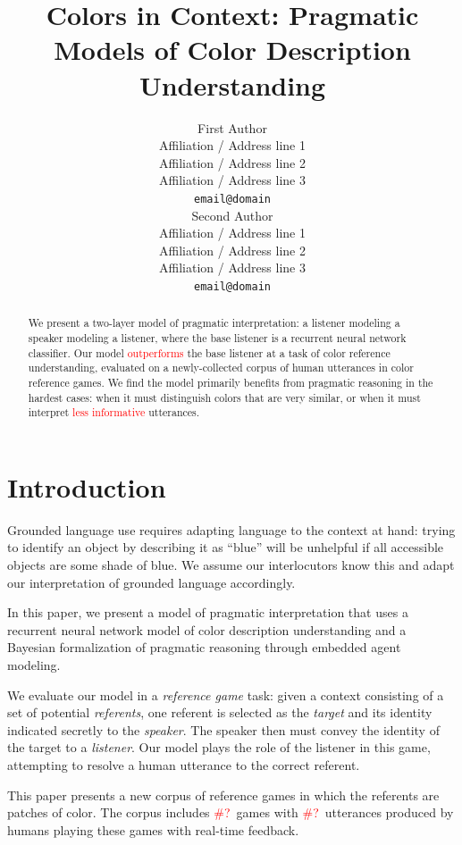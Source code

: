 \documentclass[11pt,letterpaper]{article}
\title{Colors in Context: Pragmatic Models of Color Description Understanding}
\author{First Author \\
  Affiliation / Address line 1 \\
  Affiliation / Address line 2 \\
  Affiliation / Address line 3 \\
  {\tt email@domain} \\\And
  Second Author \\
  Affiliation / Address line 1 \\
  Affiliation / Address line 2 \\
  Affiliation / Address line 3 \\
  {\tt email@domain} \\}
\date{}
\newcommand{\term}{\textit}
\renewcommand{\|}{\mid}
\newcommand{\todocheck}[1]{\textcolor{red}{#1}}
\begin{document}
\maketitle
\begin{abstract}

We present a two-layer model of pragmatic interpretation: a listener
modeling a speaker modeling a listener, where the base listener is a
recurrent neural network classifier. Our model \todocheck{outperforms} the
base listener at a task of color reference understanding, evaluated on a
newly-collected corpus of human utterances in color reference games.
We find the model primarily benefits from pragmatic reasoning in the hardest
cases: when it must distinguish colors that are very similar, or when
it must interpret \todocheck{less informative} utterances.

\end{abstract}

\section{Introduction}

Grounded language use requires adapting language to the context at hand: trying
to identify an object by describing it as ``blue'' will be unhelpful if all
accessible objects are some shade of blue. We assume our interlocutors know
this and adapt our interpretation of grounded language accordingly.

In this paper, we present a model of pragmatic interpretation that uses a
recurrent neural network model of color description understanding and a
Bayesian formalization of pragmatic reasoning through embedded agent modeling.

We evaluate our model in a \term{reference game} task: given a context consisting
of a set of potential \term{referents}, one referent is selected as the \term{target}
and its identity indicated secretly to the \term{speaker}. The speaker then must
convey the identity of the target to a \term{listener}. Our model plays the
role of the listener in this game, attempting to resolve a human utterance
to the correct referent.

This paper presents a new corpus of reference games in which the referents
are patches of color. The corpus includes \todocheck{\#?}\ games with
\todocheck{\#?}\ utterances produced by humans playing these games with real-time
feedback.
\end{document}
